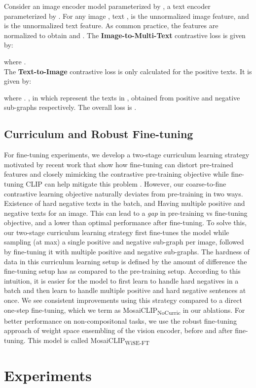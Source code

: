 \documentclass[11pt]{article}
\newcommand{\methodcompNoCurric}{MosaiCLIP\textsubscript{NoCurric}}
\newcommand{\methodcompwiseft}{MosaiCLIP\textsubscript{WiSE-FT}}
\begin{document}
Consider an image encoder model  parameterized by , a text encoder  parameterized by . For any image , text ,  is the unnormalized image feature, and  is the unnormalized text feature. As common practice, the features are normalized to obtain  and . 
\noindent The \textbf{Image-to-Multi-Text} contrastive loss is given by:
{

}where . \\
The \textbf{Text-to-Image} contrastive loss is only calculated for the positive texts. It is given by:
{

}where .
, in which  represent the texts in , obtained from positive and negative sub-graphs respectively. The overall loss is . 

\subsection{Curriculum and Robust Fine-tuning}
\label{subsec_curriculum_training}
\noindent For fine-tuning experiments, we develop a two-stage curriculum learning strategy motivated by recent work \citep{goyal2022finetune, wortsman2022robust, kumar2022fine} that show how fine-tuning can distort pre-trained features and closely mimicking the contrastive pre-training objective while fine-tuning CLIP can help mitigate this problem \citep{goyal2022finetune}. However, our coarse-to-fine contrastive learning objective naturally deviates from pre-training in two ways.  Existence of hard negative texts in the batch, and  Having multiple positive and negative texts for an image. This can lead to a \textit{gap} in pre-training vs fine-tuning objective, and a lower than optimal performance after fine-tuning. To solve this, our two-stage curriculum learning strategy first fine-tunes the model while sampling (at max) a single positive and negative sub-graph per image, followed by fine-tuning it with multiple positive and negative sub-graphs. The hardness of data in this curriculum learning setup is defined by the amount of difference the fine-tuning setup has as compared to the pre-training setup. According to this intuition, it is easier for the model to first learn to handle hard negatives in a batch and then learn to handle multiple positive and hard negative sentences at once. We see consistent improvements using this strategy compared to a direct one-step fine-tuning, which we term as \methodcompNoCurric{} in our ablations. For better performance on non-compositonal tasks, we use the robust fine-tuning approach \citep{wortsman2022robust} of weight space ensembling of the vision encoder, before and after fine-tuning. This model is called \methodcompwiseft{} \section{Experiments}
\end{document}
